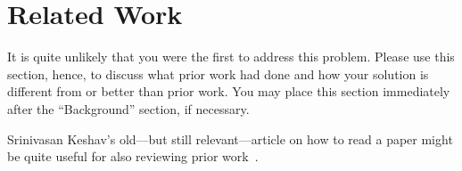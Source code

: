 \section{Related Work}\label{s:related}

It is quite unlikely that you were the first to address this problem. Please use
this section, hence, to discuss what prior work had done and how your solution
is different from or better than prior work. You may place this section
immediately after the “Background” section, if necessary.



Srinivasan Keshav's old---but still relevant---article on how to read a paper
might be quite useful for also reviewing prior work~\cite{Keshav-SIGCOMMCCR2007}.


